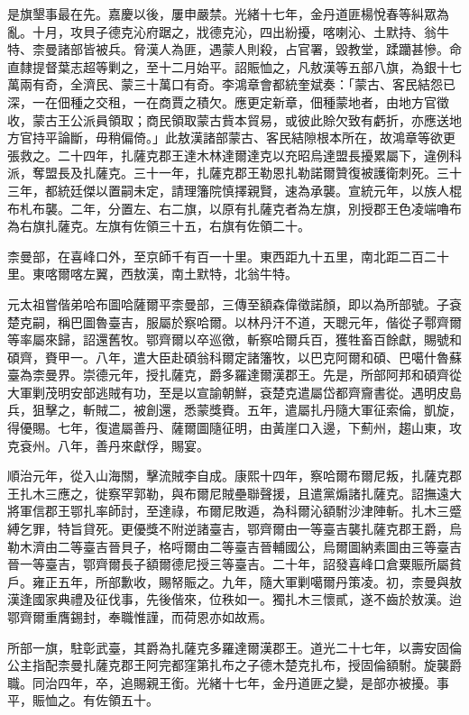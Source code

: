 \begin{pinyinscope}
是旗墾事最在先。嘉慶以後，屢申嚴禁。光緒十七年，金丹道匪楊悅春等糾眾為亂。十月，攻貝子德克沁府踞之，戕德克沁，四出紛擾，喀喇沁、土默持、翁牛特、柰曼諸部皆被兵。脅漢人為匪，遇蒙人則殺，占官署，毀教堂，蹂躪甚慘。命直隸提督葉志超等剿之，至十二月始平。詔賑恤之，凡敖漢等五部八旗，為銀十七萬兩有奇，全濟民、蒙三十萬口有奇。李鴻章會都統奎斌奏：「蒙古、客民結怨已深，一在佃種之交租，一在商賈之積欠。應更定新章，佃種蒙地者，由地方官徵收，蒙古王公派員領取；商民領取蒙古貲本貿易，或彼此賒欠致有虧折，亦應送地方官持平論斷，毋稍偏倚。」此敖漢諸部蒙古、客民結隙根本所在，故鴻章等欲更張救之。二十四年，扎薩克郡王達木林達爾達克以充昭烏達盟長擾累屬下，違例科派，奪盟長及扎薩克。三十一年，扎薩克郡王勒恩扎勒諾爾贊復被護衛刺死。三十三年，都統廷傑以置嗣未定，請理籓院慎擇親賢，速為承襲。宣統元年，以族人棍布札布襲。二年，分置左、右二旗，以原有扎薩克者為左旗，別授郡王色凌端嚕布為右旗扎薩克。左旗有佐領三十五，右旗有佐領二十。

柰曼部，在喜峰口外，至京師千有百一十里。東西距九十五里，南北距二百二十里。東喀爾喀左翼，西敖漢，南土默特，北翁牛特。

元太祖嘗偕弟哈布圖哈薩爾平柰曼部，三傳至額森偉徵諾顏，即以為所部號。子袞楚克嗣，稱巴圖魯臺吉，服屬於察哈爾。以林丹汗不道，天聰元年，偕從子鄠齊爾等率屬來歸，詔還舊牧。鄂齊爾以卒巡徼，斬察哈爾兵百，獲牲畜百餘獻，賜號和碩齊，賚甲一。八年，遣大臣赴碩翁科爾定諸籓牧，以巴克阿爾和碩、巴噶什魯蘇臺為柰曼界。崇德元年，授扎薩克，爵多羅達爾漢郡王。先是，所部阿邦和碩齊從大軍剿茂明安部逃賊有功，至是以宣諭朝鮮，袞楚克遣屬岱都齊齎書從。遇明皮島兵，狙擊之，斬賊二，被創還，悉蒙獎賚。五年，遣屬扎丹隨大軍征索倫，凱旋，得優賜。七年，復遣屬善丹、薩爾圖隨征明，由黃崖口入邊，下薊州，趨山東，攻克袞州。八年，善丹來獻俘，賜宴。

順治元年，從入山海關，擊流賊李自成。康熙十四年，察哈爾布爾尼叛，扎薩克郡王扎木三應之，徙察罕郭勒，與布爾尼賊壘聯聲援，且遣黨煽諸扎薩克。詔撫遠大將軍信郡王鄂扎率師討，至達祿，布爾尼敗遁，為科爾沁額駙沙津陣斬。扎木三蹙縛乞罪，特旨貸死。更優獎不附逆諸臺吉，鄂齊爾由一等臺吉襲扎薩克郡王爵，烏勒木濟由二等臺吉晉貝子，格哷爾由二等臺吉晉輔國公，烏爾圖納素圖由三等臺吉晉一等臺吉，鄂齊爾長子額爾德尼授三等臺吉。二十年，詔發喜峰口倉粟賑所屬貧戶。雍正五年，所部歉收，賜帑賑之。九年，隨大軍剿噶爾丹策凌。初，柰曼與敖漢逢國家典禮及征伐事，先後偕來，位秩如一。獨扎木三懷貳，遂不齒於敖漢。迨鄂齊爾重膺錫封，奉職惟謹，而荷恩亦如故焉。

所部一旗，駐彰武臺，其爵為扎薩克多羅達爾漢郡王。道光二十七年，以壽安固倫公主指配柰曼扎薩克郡王阿完都窪第扎布之子德木楚克扎布，授固倫額駙。旋襲爵職。同治四年，卒，追賜親王銜。光緒十七年，金丹道匪之變，是部亦被擾。事平，賑恤之。有佐領五十。


\end{pinyinscope}
